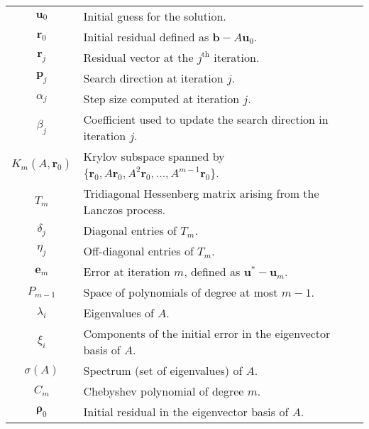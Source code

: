 \begin{longtable}{c p{10cm}}
    $\mathbf{u}_0$         & Initial guess for the solution.                                                                             \\
    $\mathbf{r}_0$         & Initial residual defined as $\mathbf{b}-A\mathbf{u}_0$.                                                     \\
    $\mathbf{r}_j$         & Residual vector at the $j^{\text{th}}$ iteration.                                                           \\
    $\mathbf{p}_j$         & Search direction at iteration $j$.                                                                          \\
    $\alpha_j$             & Step size computed at iteration $j$.                                                                        \\
    $\beta_j$              & Coefficient used to update the search direction in iteration $j$.                                           \\
    $K_m(A, \mathbf{r}_0)$ & Krylov subspace spanned by $\{\mathbf{r}_0, A\mathbf{r}_0, A^2\mathbf{r}_0, \ldots, A^{m-1}\mathbf{r}_0\}$. \\
    $T_m$                  & Tridiagonal Hessenberg matrix arising from the Lanczos process.                                             \\
    $\delta_j$             & Diagonal entries of $T_m$.                                                                                  \\
    $\eta_j$               & Off-diagonal entries of $T_m$.                                                                              \\
    $\mathbf{e}_m$         & Error at iteration $m$, defined as $\mathbf{u}^* - \mathbf{u}_m$.                                           \\
    $P_{m-1}$              & Space of polynomials of degree at most $m-1$.                                                               \\
    $\lambda_i$            & Eigenvalues of $A$.                                                                                         \\
    $\xi_i$                & Components of the initial error in the eigenvector basis of $A$.                                            \\
    $\sigma(A)$            & Spectrum (set of eigenvalues) of $A$.                                                                       \\
    $C_m$                  & Chebyshev polynomial of degree $m$.                                                                         \\
    $\mathbf{\rho}_0$     & Initial residual in the eigenvector basis of $A$.                                                            \\
\end{longtable}

